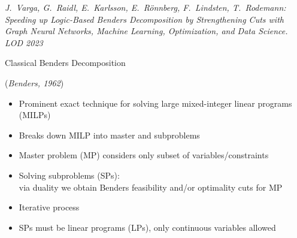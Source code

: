 \documentclass[aspectratio=1610]{beamer}
\newcommand{\important}[1]{{\color{green!60!black}#1}}
\begin{document}





\begin{frame}
	\begin{center}
		{\LARGE\bf{}}
	\end{center}

	\bigskip
	\emph{J.~Varga, G.~Raidl, E.~Karlsson, E.~Rönnberg, F.~Lindsten, T.~Rodemann: Speeding up Logic-Based Benders Decomposition by Strengthening Cuts with Graph Neural Networks, Machine Learning, Optimization, and Data Science. LOD 2023}
\end{frame}



\begin{frame}{Classical Benders Decomposition}

(\emph{Benders, 1962})

\bigskip
\begin{itemize}
	\itemsep1.5ex
	\item Prominent exact technique for solving large \important{mixed-integer linear programs (MILPs)}
	\item Breaks down MILP into \important{master} and \important{subproblems}
	\item Master problem (MP) considers only subset of variables/constraints
	\item Solving subproblems (SPs):\\
	via duality we obtain \important{Benders feasibility and/or optimality cuts} for MP
	\item Iterative process
	\item<2> \alert{SPs must be linear programs (LPs), only continuous variables allowed}
\end{itemize}
\end{frame}
\end{document}
